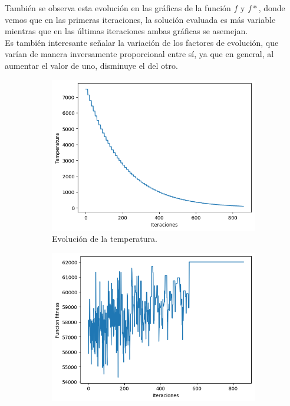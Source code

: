\documentclass[a4paper,12pt]{article}
\begin{document}
	También se observa esta evolución en las gráficas de la función $f$ y $f*$, donde vemos que en las primeras iteraciones, la solución evaluada es más variable mientras que en las últimas iteraciones ambas gráficas se asemejan.\\
	
	Es también interesante señalar la variación de los factores de evolución, que varían de manera inversamente proporcional entre sí, ya que en general, al aumentar el valor de uno, disminuye el del otro.
	
	\begin{figure}[H]
		\centering
		\begin{subfigure}{.45\textwidth}
			\centering
			\includegraphics[width=\textwidth]{include/ultima_ejec/temp.png}
			\caption{Evolución de la temperatura. }
		\end{subfigure}
		\hfill
		\begin{subfigure}{.45\textwidth}
			\centering
			\includegraphics[width=\textwidth]{include/ultima_ejec/f.png}

\end{subfigure}
\end{figure}
\end{document}
